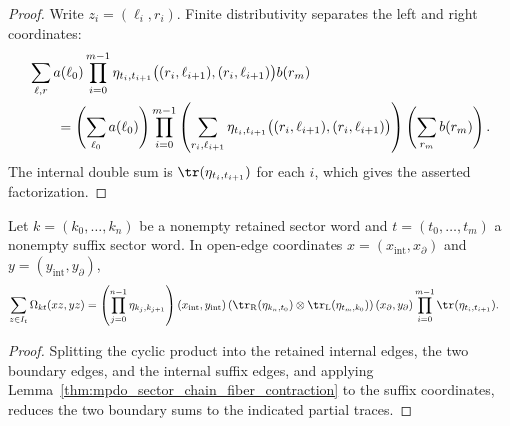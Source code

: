 \begin{proof}\leanok
    Write $z_i=(\ell_i,r_i)$. Finite distributivity separates the left and
    right coordinates:
    \begin{align}
         & \sum_{\ell,r}
        a(\ell_0)
        \prod_{i=0}^{m-1}
        \eta_{t_i,t_{i+1}}
        \bigl((r_i,\ell_{i+1}),(r_i,\ell_{i+1})\bigr)
        b(r_m)
        \notag           \\
         & \qquad=
        \left(\sum_{\ell_0}a(\ell_0)\right)
        \prod_{i=0}^{m-1}
        \left(\sum_{r_i,\ell_{i+1}}
        \eta_{t_i,t_{i+1}}
        \bigl((r_i,\ell_{i+1}),(r_i,\ell_{i+1})\bigr)\right)
        \left(\sum_{r_m}b(r_m)\right).
    \end{align}
    The internal double sum is
    $\tr(\eta_{t_i,t_{i+1}})$ for each $i$, which gives the asserted
    factorization.
\end{proof}

\begin{lemma}
    \label{thm:mpdo_nonempty_suffix_fiber_contraction}
    \leanok
    Let $k=(k_0,\ldots,k_n)$ be a nonempty retained sector word and
    $t=(t_0,\ldots,t_m)$ a nonempty suffix sector word. In open-edge
    coordinates $x=(x_{\mathrm{int}},x_{\partial})$ and
    $y=(y_{\mathrm{int}},y_{\partial})$,
    \begin{align}
        \sum_{z\in I_t}\Omega_{kt}(xz,yz)
         & =
        \left(
        \prod_{j=0}^{n-1}\eta_{k_j,k_{j+1}}
        \right)(x_{\mathrm{int}},y_{\mathrm{int}})
        \left(
        \tr_{\mathrm R}(\eta_{k_n,t_0})
        \otimes
        \tr_{\mathrm L}(\eta_{t_m,k_0})
        \right)(x_{\partial},y_{\partial})
        \prod_{i=0}^{m-1}\tr(\eta_{t_i,t_{i+1}}).
    \end{align}
\end{lemma}

\begin{proof}\leanok
    Splitting the cyclic product into the retained internal edges, the two
    boundary edges, and the internal suffix edges, and applying
    Lemma~\ref{thm:mpdo_sector_chain_fiber_contraction} to the suffix
    coordinates, reduces the two boundary sums to the indicated partial traces.
\end{proof}

